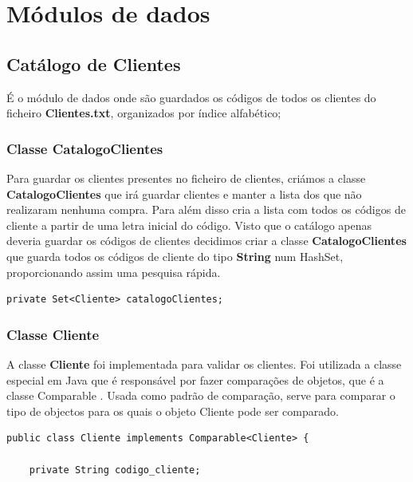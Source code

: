 \chapter{Módulos de dados}

\section{Catálogo de Clientes}
É o módulo de dados onde são guardados os códigos de todos os clientes do ficheiro \textbf{Clientes.txt}, organizados por índice alfabético;

\subsection{Classe CatalogoClientes} 

Para guardar os clientes presentes no ficheiro de clientes, criámos a classe \color{blue} \textbf{CatalogoClientes} \color{black} que
irá guardar clientes e manter a lista dos que não realizaram nenhuma compra.
Para além disso cria a lista com todos os códigos de cliente a partir de uma letra inicial do código. Visto que o catálogo apenas deveria guardar os códigos de clientes decidimos criar a classe \color{blue} \textbf{CatalogoClientes}
\color{black} que guarda todos os códigos de cliente do tipo \color{blue} \textbf{String} \color{black} num HashSet, proporcionando assim uma pesquisa rápida.

\begin{Verbatim}
private Set<Cliente> catalogoClientes;
\end{Verbatim}


\subsection{Classe Cliente}
A classe \color{blue} \textbf{Cliente} \color{black} foi implementada para validar os clientes. Foi utilizada a classe especial em Java que é responsável por fazer comparações de objetos, que é a classe \color{blue} Comparable \color{black}. Usada como padrão de comparação, serve para comparar o tipo de objectos para os quais o objeto  Cliente pode ser comparado. 

 

\begin{Verbatim}
public class Cliente implements Comparable<Cliente> {

	private String codigo_cliente;
\end{Verbatim}



